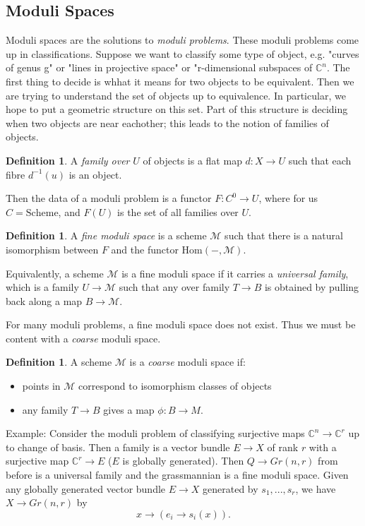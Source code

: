 \documentclass{article}
\theoremstyle{definition}
\newtheorem{definition}[theorem]{Definition}
\theoremstyle{remark}
\numberwithin{theorem}{section}
\newcommand{\C}{\mathbb{C}}
\newenvironment{defn}{
	\begin{mdframed}
		\vspace{-0.5em}
		\begin{definition}
		}{
		\end{definition}
	\end{mdframed}
}
\begin{document}
			\subsection{Moduli Spaces}
			Moduli spaces are the solutions to \emph{moduli problems}. These moduli problems come up in classifications. Suppose we want to classify some type of object, e.g. "curves of genus g" or "lines in projective space" or "r-dimensional subspaces of $\C^n$. The first thing to decide is whhat it means for two objects to be equivalent. Then we are trying to understand the set of objects up to equivalence. In particular, we hope to put a geometric structure on this set. Part of this structure is deciding when two objects are near eachother; this leads to the notion of families of objects.
			\begin{defn}
				A \emph{family over} $U$ of objects is a flat map $d:X\to U$ such that each fibre $d^{-1}(u)$ is an object.
			\end{defn}
			Then the data of a moduli problem is a functor $F:C^0\to U$, where for us $C = \mathrm{Scheme}$, and $F(U)$ is the set of all families over $U$. 
			\begin{defn}
				A \emph{fine moduli space} is a scheme $\mathcal{M}$ such that there is a natural isomorphism between $F$ and the functor Hom$(-,\mathcal{M})$. \vspace{1em}
				
				Equivalently, a scheme $\mathcal{M}$ is a fine moduli space if it carries a \emph{universal family}, which is a family $U\to\mathcal{M}$ such that any over family $T\to B$ is obtained by pulling back along a map $B\to \mathcal{M}$.
			\end{defn}
			For many moduli problems, a fine moduli space does not exist. Thus we must be content with a \emph{coarse} moduli space.
			\begin{defn}
				A scheme $\mathcal{M}$ is a \emph{coarse} moduli space if:
				\begin{itemize}
					\item points in $\mathcal{M}$ correspond to isomorphism classes of objects
					\item any family $T\to B$ gives a map $\phi:B\to M$.
				\end{itemize}
			\end{defn}			
			Example: Consider the moduli problem of classifying surjective maps $\C^n\to \C^r$ up to change of basis. Then a family is a vector bundle $E\to X$ of rank $r$ with a surjective map $\C^r \to E$ ($E$ is globally generated). Then $Q\to Gr(n,r)$ from before is a universal family and the grassmannian is a fine moduli space. Given any globally generated vector bundle $E\to X$ generated by $s_1,...,s_r$, we have $X\to Gr(n,r)$ by
			\begin{equation}
				x\to (e_i \to s_i(x)).
			\end{equation}
			
\end{document}

